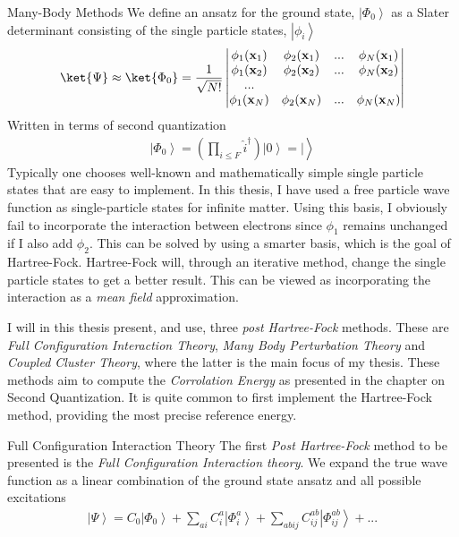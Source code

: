\documentclass[twoside,english]{uiofysmaster}
\begin{document}
\begin{chapter}{Many-Body Methods}
	We define an ansatz for the ground state, $\left| \Phi_0 \right>$ as a Slater determinant consisting of the single particle states, $\left| \phi_i \right>$
	\begin{align}
		\ket{\Psi} \approx \ket{\Phi_0} = 	\frac{1}{ \sqrt{N!} } \left|\begin{matrix}
			\phi_1(\mathbf{x}_1) & \phi_2(\mathbf{x}_1) & ... & \phi_N(\mathbf{x}_1) \\
			\phi_1(\mathbf{x}_2) & \phi_2(\mathbf{x}_2) & ... & \phi_N(\mathbf{x}_2) \\
			... & & & \\
			\phi_1(\mathbf{x}_N) & \phi_2(\mathbf{x}_N) & ... & \phi_N(\mathbf{x}_N) 
		\end{matrix} \right|
	\end{align}
	Written in terms of second quantization
	\begin{align}
		\left| \Phi_0 \right> = \left( \prod_{i \leq F} \hat i^\dagger \right) \left| 0 \right> = |\left.  \right> 
	\end{align}
	Typically one chooses well-known and mathematically simple single particle states that are easy to implement. In this thesis, I have used a free particle wave function as single-particle states for infinite matter. Using this basis, I obviously fail to incorporate the interaction between electrons since $\phi_1$ remains unchanged if I also add $\phi_2$. This can be solved by using a smarter basis, which is the goal of Hartree-Fock. Hartree-Fock will, through an iterative method, change the single particle states to get a better result. This can be viewed as incorporating the interaction as a \textit{mean field} approximation. 

	I will in this thesis present, and use, three \textit{post Hartree-Fock} methods. These are \textit{Full Configuration Interaction Theory}, \textit{Many Body Perturbation Theory} and \textit{Coupled Cluster Theory}, where the latter is the main focus of my thesis. These methods aim to compute the \textit{Corrolation Energy} as presented in the chapter on Second Quantization. It is quite common to first implement the Hartree-Fock method, providing the most precise reference energy. 

	\begin{section}{Full Configuration Interaction Theory}
		The first \textit{Post Hartree-Fock} method to be presented is the \textit{Full Configuration Interaction theory}. We expand the true wave function as a linear combination of the ground state ansatz and all possible excitations
		\begin{align}
			\left| \Psi \right> = C_0 \left| \Phi_0 \right> + \sum_{ai} C_i^a \left| \Phi_i^a \right> + \sum_{abij} C_{ij}^{ab} \left| \Phi_{ij}^{ab} \right> + ... 
		\end{align}


\end{section}
\end{chapter}
\end{document}
